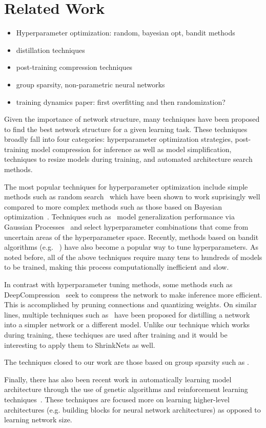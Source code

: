 \section{Related Work}

\begin{itemize}
  \item Hyperparameter optimization: random, bayesian opt, bandit methods
  \item distillation techniques
  \item post-training compression techniques
  \item group sparsity, non-parametric neural networks
  \item training dynamics paper: first overfitting and then randomization?
\end{itemize}

Given the importance of network structure, many techniques have been proposed to
find the best network structure for a given learning task.
These techniques broadly fall into four categories: hyperparameter optimization
strategies, post-training model compression for inference as well as model 
simplification, techniques to resize models during training, and 
automated architecture search methods.

The most popular techniques for hyperparameter optimization include simple 
methods such as random search~\cite{BergstraJAMESBERGSTRA2012} which have been shown to work
suprisingly well compared to more complex methods such as those based on
Bayesian optimization~\cite{Snoek12}.
Techniques such as~\cite{Snoek12} model generalization performance via 
Gaussian Processes~\cite{GaussianProcesses} and select hyperparameter 
combinations that come from uncertain areas of the hyperparameter space.
Recently, methods based on bandit algorithms (e.g. ~\cite{li2016hyperband, 
jamieson2016}) have also become a popular way to tune hyperparameters.
As noted before, all of the above techniques require many tens to hundreds of
models to be trained, making this process computationally inefficient and slow.

In contrast with hyperparameter tuning methods, some methods such as 
DeepCompression~\cite{han2015deepcompression} seek to compress the network to 
make inference more efficient.
This is accomplished by pruning connections and quantizing weights.
On similar lines, multiple techniques such as~\cite{romero2014fitnets, 
hinton2015distilling} have been proposed for distilling a network into a 
simpler network or a different model.
Unlike our technique which works during training, these techiques are used after
training and it would be interesting to apply them to ShrinkNets as well.

The techniques closed to our work are those based on group sparsity such as 
.

Finally, there has also been recent work in automatically learning model
architecture through the use of genetic algorithms and reinforcement learning 
techniques~\cite{DBLP:journals/corr/ZophL16, zoph2017learning}.
These techniques are focused more on learning higher-level architectures (e.g.
building blocks for neural network architectures) as opposed to learning 
network size.
